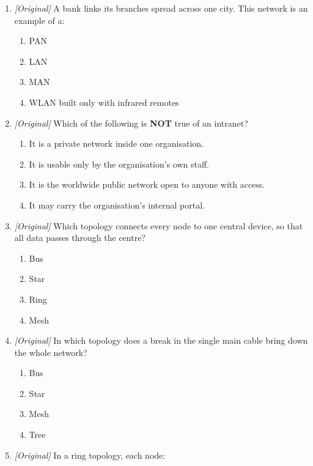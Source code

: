 \documentclass[11pt]{article}
\begin{document}
\begin{enumerate}[label=\textbf{Q\arabic*.}, leftmargin=*]
\begin{enumerate}[label=\Alph*.]
    \item LAN
    \item MAN
    \item WAN
  \end{enumerate}
\item \textit{[Original]} A bank links its branches spread across one city.
  This network is an example of a:
  \begin{enumerate}[label=\Alph*.]
    \item PAN
    \item LAN
    \item MAN
    \item WLAN built only with infrared remotes
  \end{enumerate}
\item \textit{[Original]} Which of the following is \textbf{NOT} true of an
  intranet?
  \begin{enumerate}[label=\Alph*.]
    \item It is a private network inside one organisation.
    \item It is usable only by the organisation's own staff.
    \item It is the worldwide public network open to anyone with access.
    \item It may carry the organisation's internal portal.
  \end{enumerate}
\item \textit{[Original]} Which topology connects every node to one central
  device, so that all data passes through the centre?
  \begin{enumerate}[label=\Alph*.]
    \item Bus
    \item Star
    \item Ring
    \item Mesh
  \end{enumerate}
\item \textit{[Original]} In which topology does a break in the single main
  cable bring down the whole network?
  \begin{enumerate}[label=\Alph*.]
    \item Bus
    \item Star
    \item Mesh
    \item Tree
  \end{enumerate}
\item \textit{[Original]} In a ring topology, each node:
  \begin{enumerate}[label=\Alph*.]

\end{enumerate}
\end{enumerate}
\end{document}
